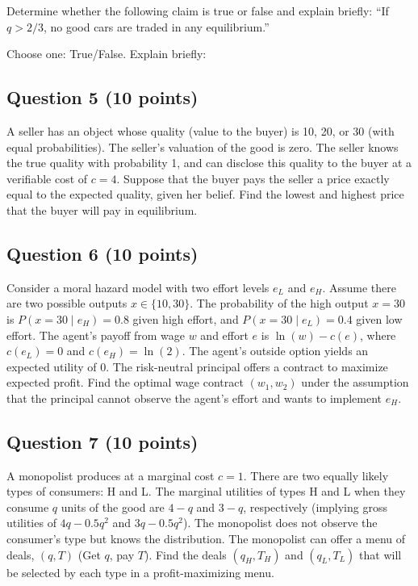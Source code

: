 \documentclass[12pt,a4paper]{article}
\begin{document}
Determine whether the following claim is true or false and explain briefly: ``If \(q > 2/3\), no good cars are traded in any equilibrium.''

\medskip
\noindent Choose one: True/False. Explain briefly:

\medskip
\noindent\framebox[\linewidth]{\rule{0pt}{2.5em}}

\subsection*{Question 5 (10 points)}

A seller has an object whose quality (value to the buyer) is 10, 20, or 30 (with equal probabilities). The seller's valuation of the good is zero. The seller knows the true quality with probability 1, and can disclose this quality to the buyer at a verifiable cost of \(c = 4\). Suppose that the buyer pays the seller a price exactly equal to the expected quality, given her belief. Find the lowest and highest price that the buyer will pay in equilibrium.

\medskip
\noindent\framebox[\linewidth]{\rule{0pt}{2.5em}}

\subsection*{Question 6 (10 points)}

Consider a moral hazard model with two effort levels \(e_L\) and \(e_H\). Assume there are two possible outputs \(x \in \{10, 30\}\). The probability of the high output \(x=30\) is \(P(x=30\mid e_H) = 0.8\) given high effort, and \(P(x=30\mid e_L) = 0.4\) given low effort. The agent's payoff from wage \(w\) and effort \(e\) is \(\ln(w) - c(e)\), where \(c(e_L) = 0\) and \(c(e_H) = \ln(2)\). The agent's outside option yields an expected utility of 0. The risk-neutral principal offers a contract to maximize expected profit. Find the optimal wage contract \((w_1, w_2)\) under the assumption that the principal cannot observe the agent's effort and wants to implement \(e_H\).

\medskip
\noindent\framebox[\linewidth]{\rule{0pt}{2.5em}}

\subsection*{Question 7 (10 points)}

A monopolist produces at a marginal cost \(c=1\). There are two equally likely types of consumers: H and L. The marginal utilities of types H and L when they consume \(q\) units of the good are \(4-q\) and \(3-q\), respectively (implying gross utilities of \(4q - 0.5q^2\) and \(3q - 0.5q^2\)). The monopolist does not observe the consumer's type but knows the distribution. The monopolist can offer a menu of deals, \((q, T)\) (Get \(q\), pay \(T\)). Find the deals \((q_H, T_H)\) and \((q_L, T_L)\) that will be selected by each type in a profit-maximizing menu.
\end{document}
